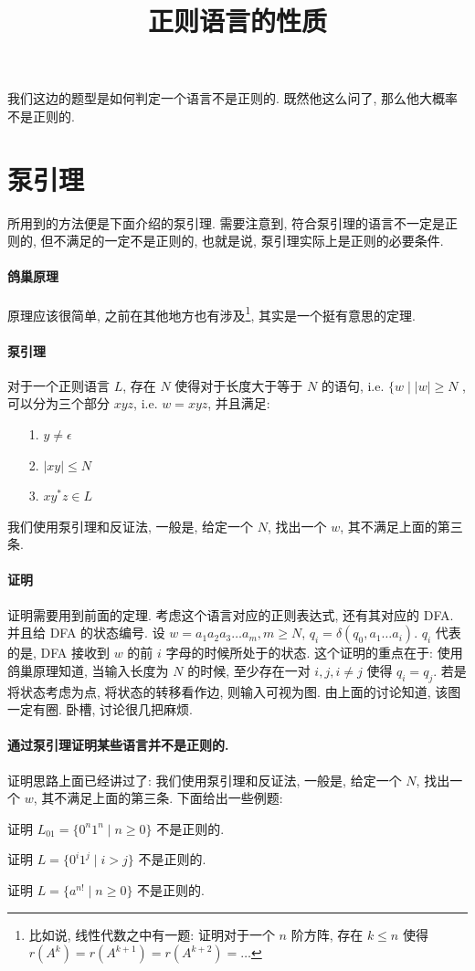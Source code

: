 \documentclass[../main.tex]{subfiles}
\begin{document}
\title{正则语言的性质}
我们这边的题型是如何判定一个语言不是正则的. 既然他这么问了, 那么他大概率不是正则的. 
\section{泵引理}\label{sec:beng}
所用到的方法便是下面介绍的泵引理. 需要注意到, 符合泵引理的语言不一定是正则的, 但不满足的一定不是正则的, 也就是说, 泵引理实际上是正则的必要条件. 
\paragraph{鸽巢原理}
原理应该很简单, 之前在其他地方也有涉及\footnote{比如说, 线性代数之中有一题: 证明对于一个 \(n\) 阶方阵, 存在 \(k \le n\) 使得 \(r (A ^{k} )= r (A ^{k + 1} ) = r (A ^{k + 2} ) = \dots\)}, 其实是一个挺有意思的定理. 

\paragraph{泵引理}
\begin{thm}
对于一个正则语言 \(L\), 存在 \(N\) 使得对于长度大于等于 \(N\) 的语句, i.e. \(\{ w \mid |w | \ge N\) , 可以分为三个部分 \(xyz\), i.e. \(w = xyz\), 并且满足: 
\begin{itemize}
\item [1.] \(y \ne \epsilon\) 
\item [2.] \(|xy | \le N\)
\item [3.] \(x y^{*} z \in L\) 
\end{itemize}
\end{thm}
我们使用泵引理和反证法, 一般是, 给定一个 \(N\), 找出一个 \(w\), 其不满足上面的第三条. 
\paragraph{证明}
证明需要用到前面的定理.  考虑这个语言对应的正则表达式, 还有其对应的 DFA. 并且给 DFA 的状态编号. 
设 \(w = a_{1} a_{2} a_{3} \dots a_{m}, m \ge N\), \(q_{i} = \hat{\delta} (q_{0} , a_{1} \dots a_{i})\). \(q_{i}\) 代表的是, DFA 接收到 \(w\) 的前 \(i\) 字母的时候所处于的状态. 这个证明的重点在于: 使用鸽巢原理知道, 当输入长度为 \(N\) 的时候, 至少存在一对 \(i, j , i \ne j\) 使得 \(q_{i} = q_{j}\). 
若是将状态考虑为点, 将状态的转移看作边, 则输入可视为图. 由上面的讨论知道, 该图一定有圈. 卧槽, 讨论很几把麻烦. 
\paragraph{通过泵引理证明某些语言并不是正则的. }
证明思路上面已经讲过了: 
我们使用泵引理和反证法, 一般是, 给定一个 \(N\), 找出一个 \(w\), 其不满足上面的第三条. 下面给出一些例题: 
\begin{exam}
证明 \(L_{01}  = \{ 0 ^{n } 1 ^{n} \mid n \ge 0\}\) 不是正则的. 
\end{exam}
\begin{exam}
证明 \(L = \{ 0 ^{i}  1 ^{j} \mid i > j \} \) 不是正则的. 
\end{exam}
\begin{exam}
证明 \(L = \{ a ^{n !} \mid n \ge 0\}\) 不是正则的. 
\end{exam}
\end{document}
